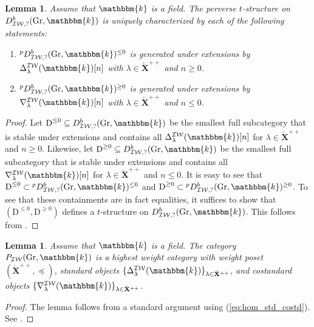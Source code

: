 \documentclass{amsart}
\renewcommand{\k}{\mathbbm{k}}
\newcommand{\bfXv}{\check{\mathbf{X}}}
\newcommand{\IW}{\mathcal{IW}}
\DeclareMathOperator{\Gr}{Gr}
\newtheorem{lemma}[subsubsection]{Lemma}
\theoremstyle{definition}
\begin{document}
    \begin{lemma}\label{lem:t_structure_generation}
        Assume that $\k$ is a field.
        The perverse $t$-structure on $D_{\IW, ?}^b (\Gr, \k)$ is uniquely characterized by each of the following statements:
        \begin{enumerate}
            \item  ${}^p D_{\IW, ?}^b (\Gr, \k)^{\leq 0}$ is generated under extensions by $\Delta_{\lambda}^{\IW} (\k) [n]$ with $\lambda \in \bfXv^{++}$ and $n \geq 0$.
            \item ${}^p D_{\IW, ?}^b (\Gr, \k)^{\geq 0}$ is generated under extensions by $\nabla_{\lambda}^{\IW} (\k) [n]$ with $\lambda \in \bfXv^{++}$ and $n \leq 0$.
        \end{enumerate}
    \end{lemma}
    \begin{proof}
        Let $\text{D}^{\leq 0} \subseteq D_{\IW, ?}^b (\Gr, \k)$ be the smallest full subcategory that is stable under extensions and contains all $\Delta_{\lambda}^{\IW} (\k) [n]$ for $\lambda \in \bfXv^{++}$ and $n \geq 0$.
        Likewise, let $\text{D}^{\geq 0} \subseteq D_{\IW, ?}^b (\Gr, \k)$ be the smallest full subcategory that is stable under extensions and contains all $\nabla_{\lambda}^{\IW} (\k) [n]$ for  $\lambda \in \bfXv^{++}$ and $n \leq 0$.
        It is easy to see that $\text{D}^{\leq 0} \subset {}^p D_{\IW, ?}^b (\Gr, \k)^{\leq 0}$ and  $\text{D}^{\geq 0} \subset {}^p D_{\IW, ?}^b (\Gr, \k)^{\geq 0}$.
        To see that these containments are in fact equalities, it suffices to show that $(\text{D}^{\leq 0}, \text{D}^{\geq 0})$ defines a $t$-structure on $D_{\IW, ?}^b (\Gr, \k)$.
        This follows from \cite[Proposition 1]{Bez01}.
    \end{proof}

    \begin{lemma}\label{lem:h_wt_str}
        Assume that $\k$ is a field.
        The category $P_{\IW} (\Gr, \k)$ is a highest weight category with weight poset $(\bfXv^{++}, \preceq)$, standard objects $\{\Delta_{\lambda}^{\IW} (\k)\}_{\lambda \in \bfXv^{++}}$, and costandard objects $\{\nabla_{\lambda}^{\IW} (\k)\}_{\lambda \in \bfXv^{++}}$.
    \end{lemma}
    \begin{proof}
        The lemma follows from a standard argument using (\ref{eq:hom_std_costd}). See \cite[\S 3.3]{BGS}.
    \end{proof}
\end{document}

